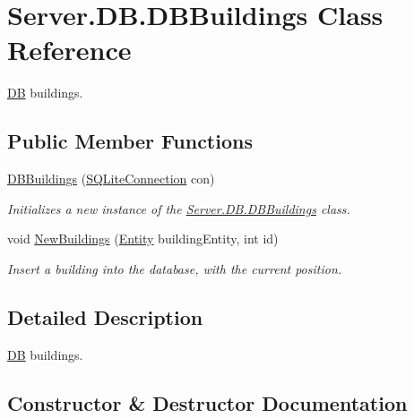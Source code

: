 \hypertarget{classServer_1_1DB_1_1DBBuildings}{}\section{Server.\+D\+B.\+D\+B\+Buildings Class Reference}
\label{classServer_1_1DB_1_1DBBuildings}


\hyperlink{namespaceServer_1_1DB}{D\+B} buildings.  


\subsection*{Public Member Functions}
\begin{DoxyCompactItemize}
\item 
\hyperlink{classServer_1_1DB_1_1DBBuildings_a077d835984df76dc1810b84223f17c07}{D\+B\+Buildings} (\hyperlink{classSQLite_1_1SQLiteConnection}{S\+Q\+Lite\+Connection} con)
\begin{DoxyCompactList}\small\item\em Initializes a new instance of the \hyperlink{classServer_1_1DB_1_1DBBuildings}{Server.\+D\+B.\+D\+B\+Buildings} class. \end{DoxyCompactList}\item 
void \hyperlink{classServer_1_1DB_1_1DBBuildings_aa0535b132cd346ceef7fa9115e3dcd76}{New\+Buildings} (\hyperlink{classCore_1_1Models_1_1Entity}{Entity} building\+Entity, int id)
\begin{DoxyCompactList}\small\item\em Insert a building into the database, with the current position. \end{DoxyCompactList}\end{DoxyCompactItemize}


\subsection{Detailed Description}
\hyperlink{namespaceServer_1_1DB}{D\+B} buildings. 



\subsection{Constructor \& Destructor Documentation}
\hypertarget{classServer_1_1DB_1_1DBBuildings_a077d835984df76dc1810b84223f17c07}{}
